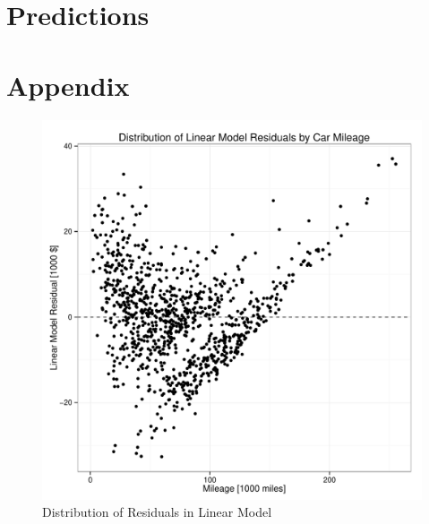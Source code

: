 \documentclass[11pt, fleqn, titlepage]{article}
\begin{document}
\section{Predictions}

\section{Appendix}

\begin{figure}[!htb]
  \centering
  \includegraphics[scale=.5]{lin_errors.pdf}
  \caption{Distribution of Residuals in Linear Model}
  \label{fig:lin_errors}
\end{figure}
\end{document}
